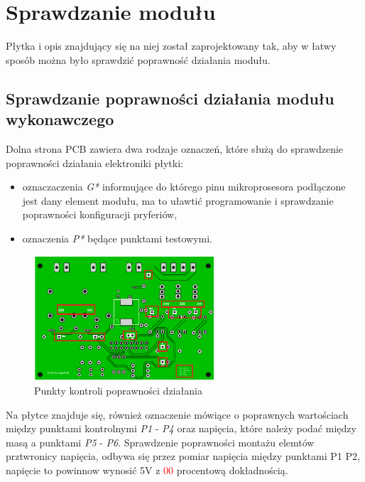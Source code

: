 \documentclass[12pt, eng, twoside, openany, final]{mgr}
\begin{document}
    \newpage
    \section{Sprawdzanie modułu}
            Płytka i opis znajdujący się na niej został zaprojektowany tak, aby w łatwy sposób można było sprawdzić poprawność działania modułu. 
            
            \subsection{Sprawdzanie poprawności działania modułu wykonawczego}
            Dolna strona PCB zawiera dwa rodzaje oznaczeń, które służą do sprawdzenie poprawności działania elektroniki płytki:
            \begin{itemize}
                \item oznaczaczenia \emph{G*} informujące do którego pinu mikroprosesora podłączone jest dany element modułu, ma to uławtić programowanie i sprawdzanie poprawności konfiguracji pryferiów,
                \item oznaczenia \emph{P*} będące punktami testowymi.
            \end{itemize}
               \begin{figure}[H]
                \begin{center}
                    \includegraphics[width=0.6\textwidth]{pcb_dol_zaz.png}
                    \caption{Punkty kontroli poprawności działania}
                \end{center}
                \end{figure}
            Na płytce znajduje się, również oznaczenie mówiące o poprawnych wartościach między punktami kontrolnymi \emph{P1} - \emph{P4} oraz napięcia, które należy podać między masą a punktami \emph{P5} - \emph{P6}.
            Sprawdzenie poprawności montażu elemtów prztwronicy napięcia, odbywa się przez pomiar napięcia między punktami P1 P2, napięcie to powinnow wynosić 5V z  \textcolor{red}{00} procentową dokładnością.
\end{document}
